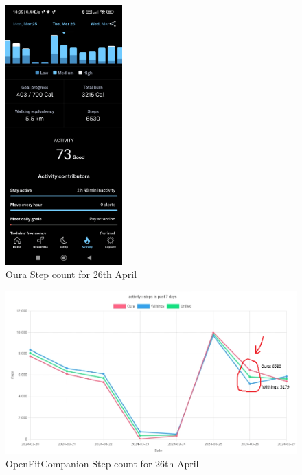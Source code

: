 \begin{figure}
    
    \centering
    \includegraphics[width=0.4\textwidth,keepaspectratio]{../images/OuraActivity.jpg}
    \caption{Oura Step count for 26th April}
    \label{fig:ouraSteps}
    
\end{figure}
\begin{figure}
    
    \centering
    \includegraphics[width=1\textwidth,keepaspectratio]{../images/dashboard.png}
    \caption{OpenFitCompanion Step count for 26th April}
    \label{fig:openFitCompanionSteps}
    
\end{figure}

